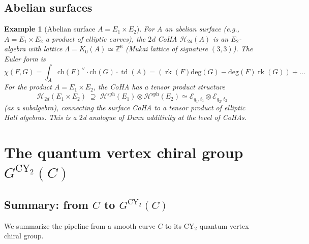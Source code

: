 \documentclass[11pt]{article}
\theoremstyle{garamondthm}
\theoremstyle{garamonddef}
\newtheorem{example}[theorem]{Example}
\theoremstyle{garamondrem}
\newcommand{\CY}{\mathrm{CY}}
\newcommand{\Etwo}{E_2}
\newcommand{\cE}{\mathcal{E}}
\newcommand{\cH}{\mathcal{H}}
\renewcommand{\deg}{\mathrm{deg}}
\newcommand{\ch}{\mathrm{ch}}
\DeclareMathOperator{\rk}{rk}
\DeclareMathOperator{\td}{td}
\begin{document}
\subsection{Abelian surfaces}
\label{ssec:abelian-surfaces}

\begin{example}[Abelian surface $A = E_1 \times E_2$]
\label{ex:abelian-surface}
For $A$ an abelian surface (e.g., $A = E_1 \times E_2$ a product of elliptic curves), the $2$d CoHA $\cH_{2d}(A)$ is an $\Etwo$-algebra with lattice $\Lambda = K_0(A) \simeq \mathbb{Z}^6$ (Mukai lattice of signature $(3,3)$). The Euler form is
\[
 \chi(F, G) = \int_A \ch(F)^\vee \cdot \ch(G) \cdot \td(A) = (\rk(F)\deg(G) - \deg(F)\rk(G)) + \ldots
\]
For the product $A = E_1 \times E_2$, the CoHA has a tensor product structure
\[
 \cH_{2d}(E_1 \times E_2) \;\supseteq\; \cH^{\mathrm{sph}}(E_1) \otimes \cH^{\mathrm{sph}}(E_2) \simeq \cE_{q_1, t_1} \otimes \cE_{q_2, t_2}
\]
(as a subalgebra), connecting the surface CoHA to a tensor product of elliptic Hall algebras. This is a $2$d analogue of Dunn additivity at the level of CoHAs.
\end{example}



\section{The quantum vertex chiral group $G^{\CY_2}(C)$}
\label{sec:qvcg-cy2}

\subsection{Summary: from $C$ to $G^{\CY_2}(C)$}
\label{ssec:summary-pipeline}

We summarize the pipeline from a smooth curve $C$ to its $\CY_2$ quantum vertex chiral group.
\end{document}
